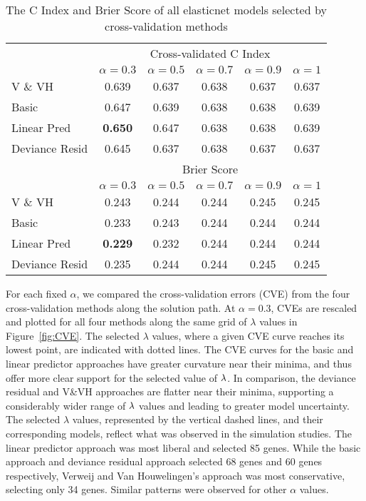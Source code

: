\begin{table}[ht]
\centering
\caption{\label{tb:shedden} The C Index and Brier Score of all elasticnet models selected by cross-validation methods }
\begin{tabular}{lccccc}
\hline
  & \multicolumn{5}{c}{Cross-validated C Index} \\ 
  & $\alpha = 0.3$ & $\alpha = 0.5$ & $\alpha = 0.7$ & $\alpha = 0.9$ & $\alpha = 1$ \\ \cline{2-6}
V $\&$ VH      & 0.639 & 0.637 & 0.638 & 0.637 & 0.637\\
Basic       & 0.647 & 0.639 & 0.638 & 0.638 & 0.639 \\
Linear Pred    & \textbf{0.650} & 0.647 & 0.638 & 0.638 & 0.639  \\
Deviance Resid & 0.645 & 0.637 & 0.638 & 0.637 & 0.637 \\ 
\addlinespace
  & \multicolumn{5}{c}{Brier Score} \\ 
  & $\alpha = 0.3$ & $\alpha = 0.5$ & $\alpha = 0.7$ & $\alpha = 0.9$ & $\alpha = 1$ \\ \cline{2-6}
V $\&$ VH  & 0.243 & 0.244 & 0.244 & 0.245 & 0.245 \\
Basic  & 0.233 & 0.243 & 0.244 & 0.244 & 0.244 \\
Linear Pred & \textbf{0.229} & 0.232 & 0.244 & 0.244 & 0.244 \\
Deviance Resid & 0.235 & 0.244 & 0.244 & 0.245 & 0.245 \\ 
\hline
\end{tabular}
\end{table}

For each fixed $\alpha$, we compared the cross-validation errors (CVE) from the four cross-validation methods along the solution path. At $\alpha = 0.3$, CVEs are rescaled and plotted for all four methods along the same grid of $\lambda$ values in Figure~\ref{fig:CVE}. The selected $\lambda$ values, where a given CVE curve reaches its lowest point, are indicated with dotted lines.  The CVE curves for the basic and linear predictor approaches have greater curvature near their minima, and thus offer more clear support for the selected value of $\lambda$.  In comparison, the deviance residual and V\&VH approaches are flatter near their minima, supporting a considerably wider range of $\lambda$ values and leading to greater model uncertainty.   The selected $\lambda$ values, represented by the vertical dashed lines, and their corresponding models, reflect what was observed in the simulation studies. The linear predictor approach was most liberal and selected 85 genes. While the basic approach and deviance residual approach selected 68 genes and 60 genes respectively, Verweij and Van Houwelingen's approach was most conservative, selecting only 34 genes.  Similar patterns were observed for other $\alpha$ values.

